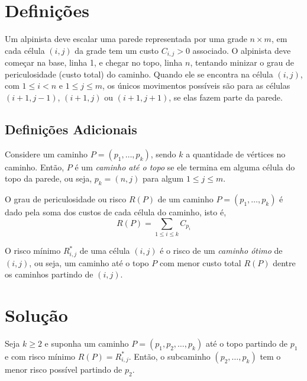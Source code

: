 \section{Definições}

Um alpinista deve escalar uma parede representada por uma grade $n \times m$, em cada célula $(i, j)$ da grade tem um custo $C_{i, j} > 0$ associado. O alpinista deve começar na base, linha 1, e chegar no topo, linha $n$, tentando minizar o grau de periculosidade (custo total) do caminho. Quando ele se encontra na célula $(i, j)$, com $1 \leq i < n$ e $1 \leq j \leq m$, os únicos movimentos possíveis são para as células $(i+1, j-1)$, $(i+1, j)$ ou $(i+1, j+1)$, se elas fazem parte da parede.

\subsection{Definições Adicionais}

\begin{definition}
    Considere um caminho $P = \left(p_1, \ldots, p_k\right)$, sendo $k$ a quantidade de vértices no caminho. Então, $P$ é um \textit{caminho até o topo} se ele termina em alguma célula do topo da parede, ou seja, $p_k = (n, j)$ para algum $1 \leq j \leq m$.
\end{definition}

\begin{definition}[Risco]
    O grau de periculosidade ou risco $R(P)$ de um caminho $P = \left(p_1, \ldots, p_k\right)$ é dado pela soma dos custos de cada célula do caminho, isto é,
    \[
        R(P) = \sum_{1 \leq i \leq k} C_{p_i}
    \]
\end{definition}

\begin{definition}
    O risco mínimo $R^*_{i, j}$ de uma célula $(i, j)$ é o risco de um \textit{caminho ótimo} de $(i, j)$, ou seja, um caminho até o topo $P$ com menor custo total $R(P)$ dentre os caminhos partindo de $(i, j)$.
\end{definition}

\section{Solução}

\begin{theorem}
    Seja $k \geq 2$ e suponha um caminho $P = \left(p_1, p_2, \ldots, p_k\right)$ até o topo partindo de $p_1$ e com risco mínimo $R(P) = R^*_{i, j}$. Então, o subcaminho $\left(p_2, \ldots, p_k\right)$ tem o menor risco possível partindo de $p_2$.
\end{theorem}


